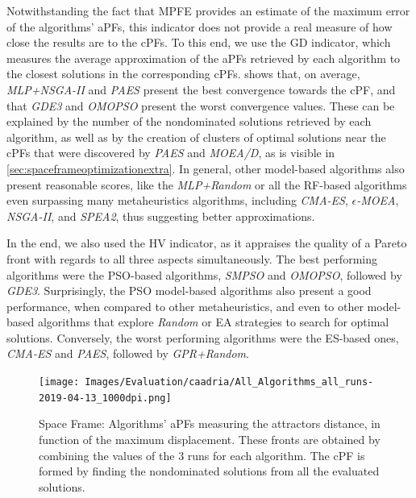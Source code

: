 Notwithstanding the fact that \ac{MPFE} provides an estimate of the maximum error of the algorithms' \acp{aPF}, this indicator does not provide a real measure of how close the results are to the \acp{cPF}. To this end, we use the \ac{GD} indicator, which measures the average approximation of the \acp{aPF} retrieved by each algorithm to the closest solutions in the corresponding \acp{cPF}.  shows that, on average, \textit{MLP+NSGA-II} and \textit{PAES} present the best convergence towards the \ac{cPF}, and that \textit{GDE3} and \textit{OMOPSO} present the worst convergence values. These can be explained by the number of the nondominated solutions retrieved by each algorithm, as well as by the creation of clusters of optimal solutions near the \acp{cPF} that were discovered by \textit{PAES} and \textit{MOEA/D}, as is visible in \cref{sec:spaceframeoptimizationextra}. In general, other model-based algorithms also present reasonable scores, like the \textit{MLP+Random} or all the \ac{RF}-based algorithms even surpassing many metaheuristics algorithms, including \textit{CMA-ES}, $\epsilon$\textit{-MOEA}, \textit{NSGA-II}, and \textit{SPEA2}, thus suggesting better approximations.

In the end, we also used the \ac{HV} indicator, as it appraises the quality of a Pareto front with regards to all three aspects simultaneously. The best performing algorithms were the \ac{PSO}-based algorithms, \textit{SMPSO} and \textit{OMOPSO}, followed by \textit{GDE3}. Surprisingly, the \ac{PSO} model-based algorithms also present a good performance, when compared to other metaheuristics, and even to other model-based algorithms that explore \textit{Random} or \ac{EA} strategies to search for optimal solutions. Conversely, the worst performing algorithms were the \ac{ES}-based ones, \textit{CMA-ES} and \textit{PAES}, followed by \textit{GPR+Random}. %
\begin{figure}[hptb]
	\centering
	\texttt{[image: Images/Evaluation/caadria/All\_Algorithms\_all\_runs-2019-04-13\_1000dpi.png]}
	\caption[Space Frame: Pareto front plot]{Space Frame: Algorithms' \acp{aPF} measuring the attractors distance, in function of the maximum displacement. These fronts are obtained by combining the values of the $3$ runs for each algorithm. The \ac{cPF} is formed by finding the nondominated solutions from all the evaluated solutions.}
	\label{fig:allruns}
\end{figure}


